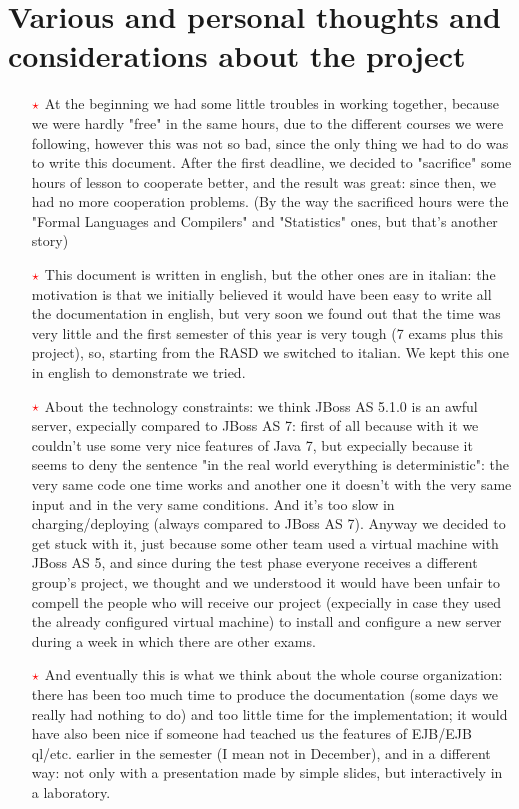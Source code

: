 \documentclass[a4paper,12pt]{article}
\begin{document}
\section{Various and personal thoughts and considerations about the project}
\begin{itemize}
\item [$\textcolor{red}{\star}$]At the beginning we had some little troubles in working together, because we were hardly "free" in the same hours, due to the different courses we were following, however this was not so bad, since the only thing we had to do was to write this document. After the first deadline, we decided to "sacrifice" some hours of lesson to cooperate better, and the result was great: since then, we had no more cooperation problems. (By the way the sacrificed hours were the "Formal Languages and Compilers" and "Statistics" ones, but that's another story)

\item[$\textcolor{red}{\star}$] This document is written in english, but the other ones are in italian: the motivation is that we initially believed it would have been easy to write all the documentation in english, but very soon we found out that the time was very little and the first semester of this year is very tough (7 exams plus this project), so, starting from the RASD we switched to italian. We kept this one in english to demonstrate we tried.

\item[$\textcolor{red}{\star}$] About the technology constraints: we think JBoss AS 5.1.0 is an awful server, expecially compared to JBoss AS 7: first of all because with it we couldn't use some very nice features of Java 7, but expecially because it seems to deny the sentence "in the real world everything is deterministic": the very same code one time works and another one it doesn't with the very same input and in the very same conditions. And it's too slow in charging/deploying (always compared to JBoss AS 7). Anyway we decided to get stuck with it, just because some other team used a virtual machine with JBoss AS 5, and since during the test phase everyone receives a different group's  project, we thought and we understood it would have been unfair to compell the people who will receive our project (expecially in case they used the already configured virtual machine) to install and configure a new server during a week in which there are other exams.

\item[$\textcolor{red}{\star}$] And eventually this is what we think about the whole course organization: there has been too much time to produce the documentation (some days we really had nothing to do) and too little time for the implementation; it would have also been nice if someone had teached us the features of EJB/EJB ql/etc. earlier in the semester (I mean not in December), and in a different way: not only with a presentation made by simple slides, but interactively in a laboratory.
\end{itemize}
\end{document}
